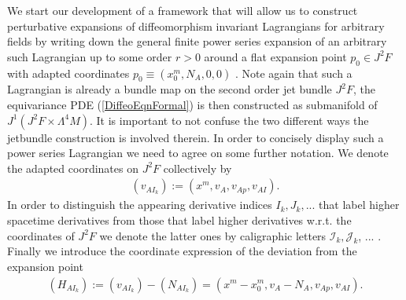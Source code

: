 \documentclass[a4paper,12pt, DIV=14, BCOR=5mm, twoside, headsepline]{scrbook}
\begin{document}
We start our development of a framework that will allow us to construct perturbative expansions of diffeomorphism invariant Lagrangians for arbitrary fields by writing down the general finite power series expansion of an arbitrary such Lagrangian up to some order $r > 0$ around a flat expansion point $p_0 \in J^2F$ with adapted coordinates $p_0 \equiv (x_0^m,N_A, 0, 0)$ . Note again that such a Lagrangian is already a bundle map on the second order jet bundle $J^2F$, the equivariance PDE (\ref{DiffeoEqnFormal}) is then constructed as submanifold of $J^1(J^2F \times \Lambda^4M)$. It is important to not confuse the two different ways the jetbundle construction is involved therein. In order to concisely display such a power series Lagrangian we need to agree on some further notation. We denote the adapted coordinates on $J^2F$ collectively by
\begin{align}
    (v_{AI_k}) := (x^m,v_A,v_{Ap},v_{AI}).
\end{align}
In order to distinguish the appearing derivative indices $I_k,J_k,...$ that label higher spacetime derivatives from those that label higher derivatives w.r.t. the coordinates of $J^2F$ we denote the latter ones by caligraphic letters
$\mathcal{I}_k, \mathcal{J}_k$, ... . Finally we introduce the coordinate expression of the deviation from the expansion point 
\begin{align}
    (H_{AI_k}) := (v_{AI_k}) - (N_{AI_k}) = (x^m-x_0^m,v_A-N_A,v_{Ap},v_{AI}).
\end{align}
\end{document}

